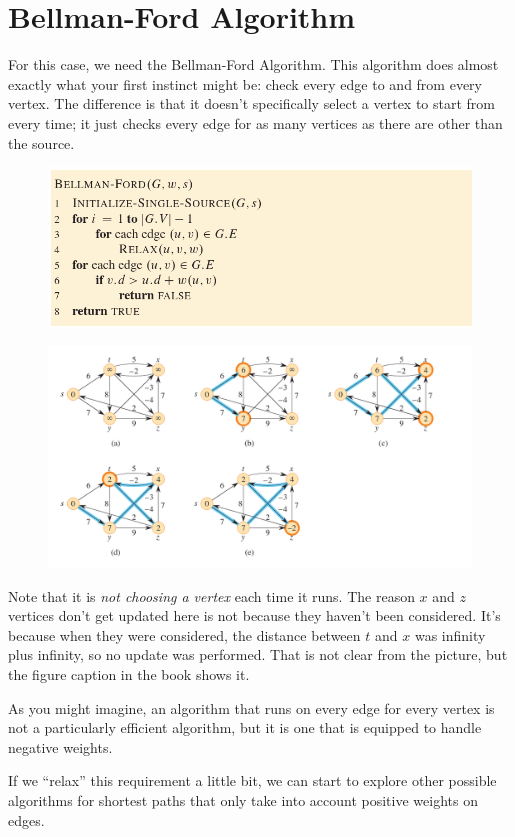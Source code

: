 \documentclass[]{article}
\begin{document}
\section*{Bellman-Ford Algorithm}

For this case, we need the Bellman-Ford Algorithm. This algorithm does almost exactly what your first instinct might be: check every edge to and from every vertex. The difference is that it doesn't specifically select a vertex to start from every time; it just checks every edge for as many vertices as there are other than the source.


\begin{figure}[h]
    \includegraphics[width=\textwidth]{ssp-bellman-ford-pseudo.png}
\end{figure}

\begin{figure}[h]
    \includegraphics[width=\textwidth]{ssp-bellman-ford.png}
\end{figure}

Note that it is \textit{not choosing a vertex} each time it runs. The reason $x$ and $z$ vertices don't get updated here is not because they haven't been considered. It's because when they were considered, the distance between $t$ and $x$ was infinity plus infinity, so no update was performed. That is not clear from the picture, but the figure caption in the book shows it. 

As you might imagine, an algorithm that runs on every edge for every vertex is not a particularly efficient algorithm, but it is one that is equipped to handle negative weights. 

If we ``relax'' this requirement a little bit, we can start to explore other possible algorithms for shortest paths that only take into account positive weights on edges. 
\end{document}

